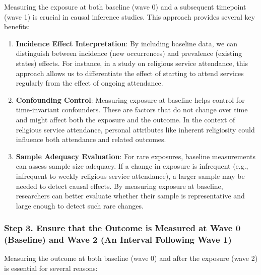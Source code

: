 \documentclass[
  singlecolumn,
  9pt]{article}
\begin{document}
Measuring the exposure at both baseline (wave 0) and a subsequent
timepoint (wave 1) is crucial in causal inference studies. This approach
provides several key benefits:

\begin{enumerate}
\def\labelenumi{\arabic{enumi}.}
\item
  \textbf{Incidence Effect Interpretation}: By including baseline data,
  we can distinguish between incidence (new occurrences) and prevalence
  (existing states) effects. For instance, in a study on religious
  service attendance, this approach allows us to differentiate the
  effect of starting to attend services regularly from the effect of
  ongoing attendance.
\item
  \textbf{Confounding Control}: Measuring exposure at baseline helps
  control for time-invariant confounders. These are factors that do not
  change over time and might affect both the exposure and the outcome.
  In the context of religious service attendance, personal attributes
  like inherent religiosity could influence both attendance and related
  outcomes.
\item
  \textbf{Sample Adequacy Evaluation}: For rare exposures, baseline
  measurements can assess sample size adequacy. If a change in exposure
  is infrequent (e.g., infrequent to weekly religious service
  attendance), a larger sample may be needed to detect causal effects.
  By measuring exposure at baseline, researchers can better evaluate
  whether their sample is representative and large enough to detect such
  rare changes.
\end{enumerate}

\subsubsection{Step 3. Ensure that the Outcome is Measured at Wave 0
(Baseline) and Wave 2 (An Interval Following Wave
1)}\label{step-3.-ensure-that-the-outcome-is-measured-at-wave-0-baseline-and-wave-2-an-interval-following-wave-1}

Measuring the outcome at both baseline (wave 0) and after the exposure
(wave 2) is essential for several reasons:
\end{document}
